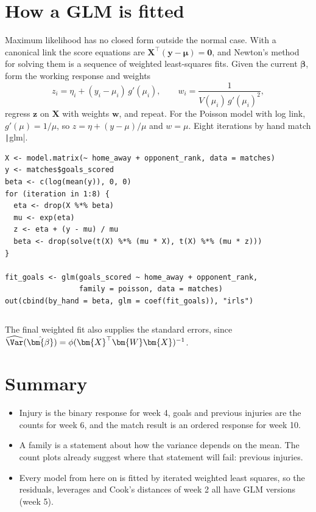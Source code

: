 \documentclass[12pt,notitlepage]{report}
\begin{document}
\inputminted{text}{output/lm-is-glm.txt}
\inputminted{text}{output/dispersion.txt}

\section{How a GLM is fitted}

Maximum likelihood has no closed form outside the normal case. With a
canonical link the score equations are
$\bm{X}^\top(\bm{y} - \bm{\mu}) = \bm{0}$, and Newton's method for solving
them is a sequence of weighted least-squares fits. Given the current
$\bm{\beta}$, form the working response and weights
\[
  z_i = \eta_i + (y_i - \mu_i)\, g'(\mu_i),
  \qquad
  w_i = \frac{1}{V(\mu_i)\, g'(\mu_i)^2},
\]
regress $\bm{z}$ on $\bm{X}$ with weights $\bm{w}$, and repeat. For the
Poisson model with log link, $g'(\mu) = 1/\mu$, so $z = \eta + (y - \mu)/\mu$
and $w = \mu$. Eight iterations by hand match \texttt|glm|.

\begin{verbatim}
X <- model.matrix(~ home_away + opponent_rank, data = matches)
y <- matches$goals_scored
beta <- c(log(mean(y)), 0, 0)
for (iteration in 1:8) {
  eta <- drop(X %*% beta)
  mu <- exp(eta)
  z <- eta + (y - mu) / mu
  beta <- drop(solve(t(X) %*% (mu * X), t(X) %*% (mu * z)))
}

fit_goals <- glm(goals_scored ~ home_away + opponent_rank,
                 family = poisson, data = matches)
out(cbind(by_hand = beta, glm = coef(fit_goals)), "irls")
\end{verbatim}

\inputminted{text}{output/irls.txt}

The final weighted fit also supplies the standard errors, since
$\widehat{\Var}(\hat{\bm{\beta}}) = \phi(\bm{X}^\top \bm{W} \bm{X})^{-1}$.

\section{Summary}

\begin{itemize}
  \item Injury is the binary response for week 4, goals and previous injuries
    are the counts for week 6, and the match result is an ordered response
    for week 10.
  \item A family is a statement about how the variance depends on the mean.
    The count plots already suggest where that statement will fail: previous
    injuries.
  \item Every model from here on is fitted by iterated weighted least
    squares, so the residuals, leverages and Cook's distances of week 2 all
    have GLM versions (week 5).
\end{itemize}
\end{document}
